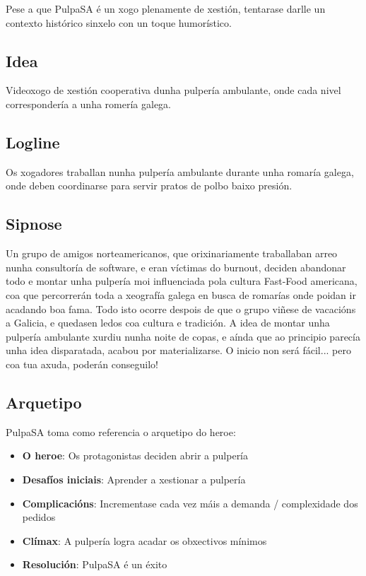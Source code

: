 \documentclass{report}  %
\begin{document}
Pese a que PulpaSA é un xogo plenamente de xestión, tentarase darlle un contexto histórico sinxelo con un toque humorístico.

\subsection{Idea}

Videoxogo de xestión cooperativa dunha pulpería ambulante, onde cada nivel correspondería a unha romería galega.

\subsection{Logline}

Os xogadores traballan nunha pulpería ambulante durante unha romaría galega, onde deben coordinarse para servir pratos de polbo baixo presión.

\subsection{Sipnose}

Un grupo de amigos norteamericanos, que orixinariamente traballaban arreo nunha consultoría de software, e eran víctimas do burnout, deciden
abandonar todo e montar unha pulpería moi influenciada pola cultura Fast-Food americana, coa que percorrerán toda a xeografía galega en busca de romarías onde poidan ir acadando boa fama.
 Todo isto ocorre despois de que o grupo viñese de vacacións a Galicia, e quedasen ledos coa cultura
e tradición. A idea de montar unha pulpería ambulante xurdiu nunha noite de copas, e aínda que ao principio parecía unha idea disparatada,
acabou por materializarse. O inicio non será fácil... pero coa tua axuda, poderán conseguilo!

\subsection{Arquetipo}

PulpaSA toma como referencia o arquetipo do heroe:
\begin{itemize}
    \item \textbf{O heroe}: Os protagonistas deciden abrir a pulpería
    \item \textbf{Desafíos iniciais}: Aprender a xestionar a pulpería
    \item \textbf{Complicacións}: Incrementase cada vez máis a demanda / complexidade dos pedidos
    \item \textbf{Clímax}: A pulpería logra acadar os obxectivos mínimos
    \item \textbf{Resolución}: PulpaSA é un éxito
\end{itemize}
\end{document}

